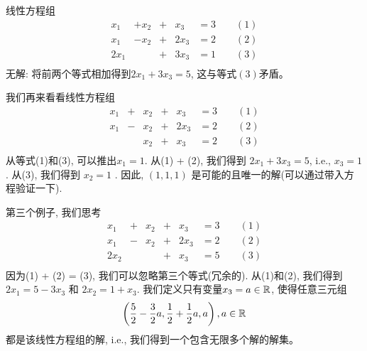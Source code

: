 \begin{example}
    线性方程组
    \begin{equation}
        \begin{aligned}
            x_1 & + x_2 & + &x_3 &= 3 \qquad (1)\\
             x_1 & - x_2 & + & 2x_3 &= 2 \qquad (2) \\
            2x_1 & & + &3x_3 &= 1 \qquad (3) \\
        \end{aligned}
    \end{equation}
    无解: 将前两个等式相加得到$2x_1 + 3x_3 = 5$, 这与等式$(3)$矛盾。

    我们再来看看线性方程组
    \begin{equation}
        \begin{aligned}
            x_1 & + & x_2 & + &x_3 &= 3 \qquad (1)\\
            x_1 & - & x_2 & + &2x_3 &= 2 \qquad (2) \\
                 &   & x_2 & + &x_3 &= 2 \qquad (3) \\
        \end{aligned}
    \end{equation}
    从等式(1)和(3), 可以推出$x_1 = 1$.
    从(1) + (2), 我们得到 $2x_1 + 3x_3 = 5$, i.e., $x_3 = 1$.
    从(3), 我们得到 $x_2 = 1$ .
    因此, $(1,1,1)$ 是可能的且唯一的解(可以通过带入方程验证一下).

    第三个例子, 我们思考
    \begin{equation}
        \begin{aligned}
            x_1 & + & x_2 & + &x_3 &= 3 \qquad (1)\\
            x_1 & - & x_2 & + &2x_3 &= 2 \qquad (2) \\
            2x_2&   &     & + &x_3 &= 5 \qquad (3) \\
        \end{aligned}
    \end{equation}
    因为(1) + (2) = (3), 我们可以忽略第三个等式(冗余的).
    从(1)和(2), 我们得到$2x_1 = 5 - 3x_3$ 和 $2x_2 = 1 + x_3$.
    我们定义只有变量$x_3 = a \in \mathbb{R}$, 使得任意三元组
    \begin{equation}
        \left(
        \frac{5}{2} - \frac{3}{2}a, \frac{1}{2} + \frac{1}{2} a, a
        \right),
        a \in \mathbb{R}
    \end{equation}
    都是该线性方程组的解, i.e., 我们得到一个包含无限多个解的解集。
\end{example}

